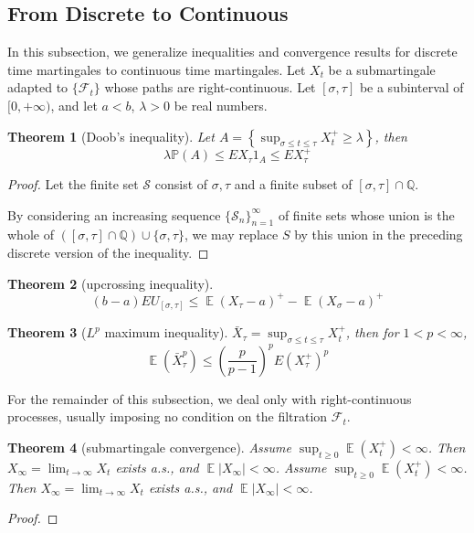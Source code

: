 \documentclass{article}
\newtheorem{Thm}{Theorem}[section]
\theoremstyle{definition}
\newcommand{\EE}{\operatorname{\mathbb{E}}}
\newcommand{\PP}{\mathbb{P}}
\renewcommand{\leq}{\leqslant}
\renewcommand{\geq}{\geqslant}
\newcommand{\<}{\left\langle}
\renewcommand{\>}{\right\rangle}
\begin{document}
\subsection{From Discrete to Continuous}
In this subsection, we generalize inequalities and convergence results for discrete time martingales to continuous time martingales.\newline 
Let $X_t$ be a submartingale adapted to $\{\mathcal{F}_t\}$ whose paths are right-continuous. Let $[\sigma,\tau]$ be a subinterval of $[0,+\infty)$,
and let $a<b$, $\lambda>0$ be real numbers.
\begin{Thm}[Doob's inequality]
    Let $A=\left\{ \sup_{\sigma\leq t\leq \tau}X_t^+  \geq\lambda\right\}$, then \[\lambda \PP(A)\leq EX_\tau1_A\leq EX_\tau^+\]
\end{Thm}
\begin{proof}
    Let the finite set $\mathcal{S}$ consist of $\sigma,\tau$ and a finite subset of $[\sigma,\tau]\cap \mathbb{Q}$.

    By considering an increasing sequence $\{\mathcal{S}_n\}_{n=1}^\infty$ of finite sets whose union is the whole of $([\sigma,\tau]\cap \mathbb{Q})\cup\{\sigma,\tau\}$,
    we may replace $S$ by this union in the preceding discrete version of the inequality.
\end{proof}

\begin{Thm}[upcrossing inequality]
    \[(b-a)EU_{[\sigma,\tau]}\leq \EE(X_\tau-a)^+-\EE(X_\sigma-a)^+\]
\end{Thm}

\begin{Thm}[$L^p$ maximum inequality]
    $\bar{X}_\tau= \sup_{\sigma\leq t\leq \tau}X_t^+$, then for $1<p<\infty$, \[\EE(\bar{X}_\tau^p)\leq (\frac{p}{p-1})^pE(X_\tau^+)^p\]
\end{Thm}



For the remainder of this subsection, we deal only with right-continuous processes,
usually imposing no condition on the filtration $\mathcal{F}_t$.
\begin{Thm}[submartingale convergence]
    Assume $\sup_{t\geq 0} \EE(X_t^+)<\infty$. Then $X_\infty =\lim_{t\to\infty} X_t$ exists a.s., and $\EE|X_\infty|<\infty$.
    Assume $\sup_{t\geq 0} \EE(X_t^+)<\infty$. Then $X_\infty =\lim_{t\to\infty} X_t$ exists a.s., and $\EE|X_\infty|<\infty$.
\end{Thm}
\begin{proof}
    
\end{proof}
\end{document}
